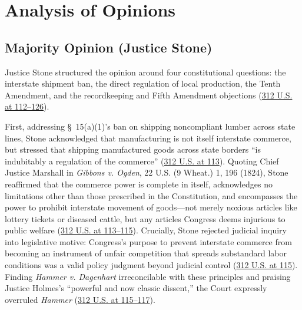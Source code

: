 \documentclass[12pt]{article}
\begin{document}
\section{Analysis of Opinions}

\subsection{Majority Opinion (Justice Stone)}

Justice Stone structured the opinion around four constitutional questions: the interstate shipment ban, the direct regulation of local production, the Tenth Amendment, and the recordkeeping and Fifth Amendment objections (\href{https://supreme.justia.com/cases/federal/us/312/100/}{312 U.S. at 112--126}).

First, addressing \S~15(a)(1)'s ban on shipping noncompliant lumber across state lines, Stone acknowledged that manufacturing is not itself interstate commerce, but stressed that shipping manufactured goods across state borders ``is indubitably a regulation of the commerce'' (\href{https://supreme.justia.com/cases/federal/us/312/100/}{312 U.S. at 113}). Quoting Chief Justice Marshall in \textit{Gibbons v. Ogden}, 22 U.S. (9 Wheat.) 1, 196 (1824), Stone reaffirmed that the commerce power is complete in itself, acknowledges no limitations other than those prescribed in the Constitution, and encompasses the power to prohibit interstate movement of goods---not merely noxious articles like lottery tickets or diseased cattle, but any articles Congress deems injurious to public welfare (\href{https://supreme.justia.com/cases/federal/us/312/100/}{312 U.S. at 113--115}). Crucially, Stone rejected judicial inquiry into legislative motive: Congress's purpose to prevent interstate commerce from becoming an instrument of unfair competition that spreads substandard labor conditions was a valid policy judgment beyond judicial control (\href{https://supreme.justia.com/cases/federal/us/312/100/}{312 U.S. at 115}). Finding \textit{Hammer v. Dagenhart} irreconcilable with these principles and praising Justice Holmes's ``powerful and now classic dissent,'' the Court expressly overruled \textit{Hammer} (\href{https://supreme.justia.com/cases/federal/us/312/100/}{312 U.S. at 115--117}).
\end{document}
